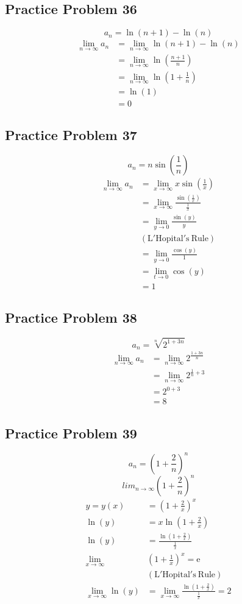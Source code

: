 \documentclass[letterpaper, 12pt]{article}
\newcommand*{\e}{\mathrm{e}}
\begin{document}
\subsection*{Practice Problem 36}
\[ a_{n} = \ln(n+1)-\ln(n) \]
\begin{align*}
  \lim_{n\to\infty}{a_{n}} &= \lim_{n\to\infty}{\ln(n+1)-\ln(n)} \\
  &= \lim_{n\to\infty}{\ln(\frac{n+1}{n})} \\
  &= \lim_{n\to\infty}{\ln(1+\frac{1}{n})} \\
  &= \ln(1) \\
  &= 0
\end{align*}

\subsection*{Practice Problem 37}
\[ a_{n} = n\sin(\frac{1}{n}) \]
\begin{align*}
  \lim_{n\to\infty}{a_{n}} &= \lim_{x\to\infty}{x\sin(\frac{1}{x})} \\
  &= \lim_{x\to\infty}{\frac{\sin(\frac{1}{x})}{\frac{1}{x}}} \\
  &= \lim_{y\to0}{\frac{\sin(y)}{y}} \\
  & \mathrm{(L'Hopital's\ Rule)} \\
  &= \lim_{y\to0}{\frac{\cos(y)}{1}} \\
  &= \lim_{t\to0}{\cos(y)} \\
  &= 1
\end{align*}

\subsection*{Practice Problem 38}
\[ a_{n} = \sqrt[n]{2^{1+3n}} \]
\begin{align*}
  \lim_{n\to\infty}{a_{n}} &= \lim_{n\to\infty}{2^{\frac{1+3n}{n}}} \\
  &= \lim_{n\to\infty}{2^{\frac{1}{n}+3}} \\
  &= 2^{0+3} \\
  &= 8
\end{align*}

\subsection*{Practice Problem 39}
\[ a_{n} = (1+\frac{2}{n})^{n} \]
\[ lim_{n\to\infty}{(1+\frac{2}{n})^{n}} \]
\begin{align*}
  y = y(x) &= (1+\frac{2}{x})^{x} \\
  \ln(y) &= x\ln(1+\frac{2}{x}) \\
  \ln(y) &= \frac{\ln(1+\frac{2}{x})}{\frac{1}{x}} \\
  \lim_{x\to\infty}&{(1+\frac{1}{x})^{x}} = \e \\
  & \mathrm{(L'Hopital's\ Rule)} \\
  \lim_{x\to\infty}{\ln(y)} &=
    \lim_{x\to\infty}{\frac{\ln(1+\frac{2}{x})}{\frac{1}{x}}} = 2
\end{align*}
\end{document}
